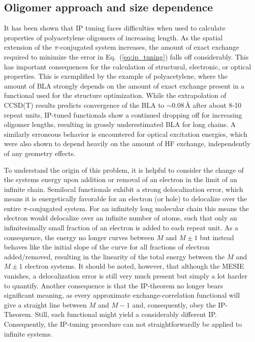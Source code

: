 \documentclass[journal=jctcce,manuscript=article,layout=twocolumn]{achemso}
\begin{document}
\subsection*{Oligomer approach and size dependence}
It has been shown that IP tuning faces difficulties when used to calculate properties of polyacetylene oligomers of increasing length. As the spatial extension of the $\pi$-conjugated system increases, the amount of exact exchange required to minimize the error in Eq.~(\ref{eq:ip_tuning}) falls off considerably.\cite{jcp_2011_range_sep_conj, phys_rev_let_2016_tuning_lrc_polyene_baer_paper} This has important consequences for the calculation of structural, electronic, or optical properties.
This is exemplified by the example of polyacetylene, where the amount of BLA strongly depends
on the amount of exact exchange present in a functional used for the structure optimization.\cite{jcp_2012_wPBE_PBEh_BLA_MESIE,jctc_2016_BLA_Ex_thermal}
While the extrapolation of CCSD(T) results predicts convergence of the BLA to $\sim$0.08\,{\AA} after about 8-10 repeat units, IP-tuned functionals show a continued dropping off for increasing oligomer lengths, resulting in grossly underestimated BLA for long chains.\cite{jcp_2012_wPBE_PBEh_BLA_MESIE,acc_chem_res_2014_tuning_polyene} A similarly erroneous behavior 
is encountered for optical excitation
energies, which were also shown to depend heavily on the amount of HF exchange, independently of any geometry effects.\cite{jctc_2016_BLA_Ex_thermal}

To understand the origin of this problem, it is helpful to consider the change of the systems energy upon addition or removal of an electron in the limit of an infinite chain. Semilocal functionals exhibit a strong delocalization error, which means 
it is energetically favorable for an electron (or hole) to delocalize over the entire $\pi$-conjugated system. 
For an infinitely long molecular chain this means the electron would delocalize over an infinite number of atoms, such that only an infinitesimally small fraction of an electron is added to each repeat unit. As a consequence, the energy no longer curves between $M$ and $M\pm1$ but instead behaves like the initial slope of the curve for all fractions of electron added/removed, resulting in the linearity of the total energy between the $M$ and $M\pm1$ electron systems.\cite{phys_rev_let_2008_piecewise_linearity_finite_infinite,jcp_2015_piecewise_linearity_solid_state_finite} It should
be noted, however, that although the MESIE vanishes, a delocalization error is still very much present but simply a lot harder to quantify.
Another consequence is that the IP-theorem no longer bears significant meaning, as every approximate exchange-correlation functional will give a straight line between $M$ and $M-1$ and, consequently, obey the IP-Theorem. Still, each functional might yield a considerably different IP. Consequently, the IP-tuning procedure can not straightforwardly be applied to infinite systems. 
\end{document}
